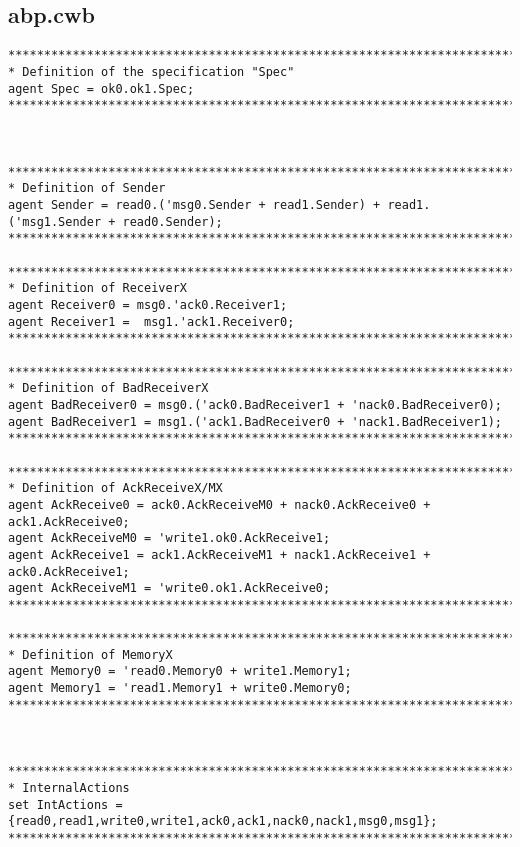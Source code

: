\subsection{abp.cwb}\label{sec:cwb-definition}
\begin{verbatim}
*******************************************************************************
* Definition of the specification "Spec"
agent Spec = ok0.ok1.Spec;
*******************************************************************************



*******************************************************************************
* Definition of Sender
agent Sender = read0.('msg0.Sender + read1.Sender) + read1.('msg1.Sender + read0.Sender);
*******************************************************************************

*******************************************************************************
* Definition of ReceiverX
agent Receiver0 = msg0.'ack0.Receiver1;
agent Receiver1 =  msg1.'ack1.Receiver0;
*******************************************************************************

*******************************************************************************
* Definition of BadReceiverX
agent BadReceiver0 = msg0.('ack0.BadReceiver1 + 'nack0.BadReceiver0);
agent BadReceiver1 = msg1.('ack1.BadReceiver0 + 'nack1.BadReceiver1);
*******************************************************************************

*******************************************************************************
* Definition of AckReceiveX/MX
agent AckReceive0 = ack0.AckReceiveM0 + nack0.AckReceive0 + ack1.AckReceive0;
agent AckReceiveM0 = 'write1.ok0.AckReceive1;
agent AckReceive1 = ack1.AckReceiveM1 + nack1.AckReceive1 + ack0.AckReceive1;
agent AckReceiveM1 = 'write0.ok1.AckReceive0;
*******************************************************************************

*******************************************************************************
* Definition of MemoryX
agent Memory0 = 'read0.Memory0 + write1.Memory1;
agent Memory1 = 'read1.Memory1 + write0.Memory0;
*******************************************************************************



*******************************************************************************
* InternalActions
set IntActions = {read0,read1,write0,write1,ack0,ack1,nack0,nack1,msg0,msg1};
*******************************************************************************




\end{verbatim}
